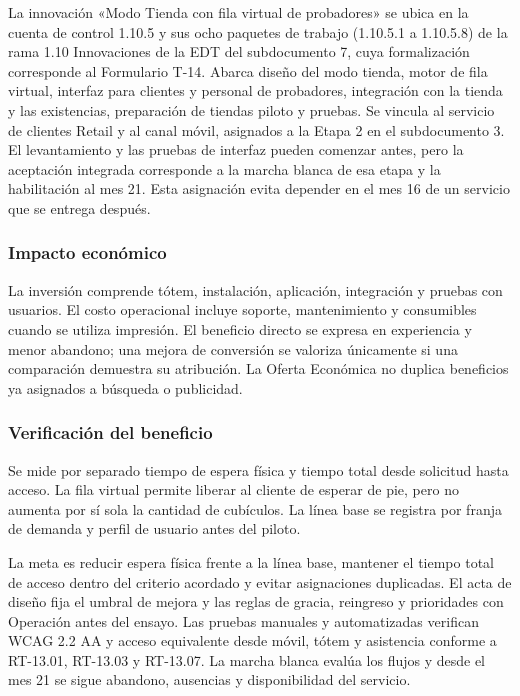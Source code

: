 \documentclass[11pt]{article}
\begin{document}
La innovación «Modo Tienda con fila virtual de probadores» se ubica en la cuenta de control 1.10.5 y sus ocho paquetes de trabajo (1.10.5.1 a 1.10.5.8) de la rama 1.10 Innovaciones de la EDT del subdocumento 7, cuya formalización corresponde al Formulario T-14. Abarca diseño del modo tienda, motor de fila virtual, interfaz para clientes y personal de probadores, integración con la tienda y las existencias, preparación de tiendas piloto y pruebas. Se vincula al servicio de clientes Retail y al canal móvil, asignados a la Etapa 2 en el subdocumento 3. El levantamiento y las pruebas de interfaz pueden comenzar antes, pero la aceptación integrada corresponde a la marcha blanca de esa etapa y la habilitación al mes 21. Esta asignación evita depender en el mes 16 de un servicio que se entrega después.

\subsubsection{Impacto económico}\label{impacto-econuxf3mico-4}

La inversión comprende tótem, instalación, aplicación, integración y pruebas con usuarios. El costo operacional incluye soporte, mantenimiento y consumibles cuando se utiliza impresión. El beneficio directo se expresa en experiencia y menor abandono; una mejora de conversión se valoriza únicamente si una comparación demuestra su atribución. La Oferta Económica no duplica beneficios ya asignados a búsqueda o publicidad.

\subsubsection{Verificación del beneficio}\label{verificaciuxf3n-del-beneficio-4}

Se mide por separado tiempo de espera física y tiempo total desde solicitud hasta acceso. La fila virtual permite liberar al cliente de esperar de pie, pero no aumenta por sí sola la cantidad de cubículos. La línea base se registra por franja de demanda y perfil de usuario antes del piloto.

La meta es reducir espera física frente a la línea base, mantener el tiempo total de acceso dentro del criterio acordado y evitar asignaciones duplicadas. El acta de diseño fija el umbral de mejora y las reglas de gracia, reingreso y prioridades con Operación antes del ensayo. Las pruebas manuales y automatizadas verifican WCAG 2.2 AA y acceso equivalente desde móvil, tótem y asistencia conforme a RT-13.01, RT-13.03 y RT-13.07. La marcha blanca evalúa los flujos y desde el mes 21 se sigue abandono, ausencias y disponibilidad del servicio.
\end{document}
